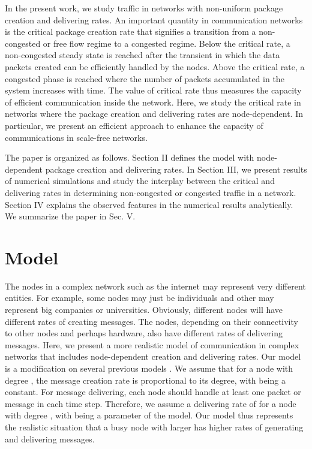 \documentclass[aps,prl,twocolumn,superscriptaddress,showpacs]{revtex4}
\begin{document}
In the present work, we study traffic in networks with non-uniform
package creation and delivering rates. An important quantity in
communication networks is the critical package creation rate that
signifies a transition from a non-congested or free flow regime to
a congested regime. Below the critical rate, a non-congested
steady state is reached after the transient in which the data
packets created can be efficiently handled by the nodes. Above the
critical rate, a congested phase is reached where the number of
packets accumulated in the system increases with time.  The value
of critical rate thus measures the capacity of efficient
communication inside the network.  Here, we study the critical
rate in networks where the package creation and delivering rates
are node-dependent.  In particular, we present an efficient
approach to enhance the capacity of communications in scale-free
networks.

The paper is organized as follows. Section II defines the model
with node-dependent package creation and delivering rates. In
Section III, we present results of numerical simulations and study
the interplay between the critical and delivering rates in
determining non-congested or congested traffic in a network.
Section IV explains the observed features in the numerical results
analytically.  We summarize the paper in Sec. V.

\section{Model}

The nodes in a complex network such as the internet may represent
very different entities.  For example, some nodes may just be
individuals and other may represent big companies or universities.
Obviously, different nodes will have different rates of creating
messages.  The nodes, depending on their connectivity to other
nodes and perhaps hardware, also have different rates of
delivering messages.  Here, we present a more realistic model of
communication in complex networks that includes node-dependent
creation and delivering rates.  Our model is a modification on
several previous models
\cite{arenas1:2002,arenas2:2004,arenas3:2003,moreno1:2003,moreno2:2004,moreno3:2004,zhao:2005}.
We assume that for a node  with degree , the message
creation rate  is proportional to its degree, with
 being a constant.  For message delivering, each node
should handle at least one packet or message in each time step.
Therefore, we assume a delivering rate of  for a node
with degree , with  being a parameter of the
model. Our model thus represents the realistic situation that a
busy node with larger  has higher rates of generating and
delivering messages.
\end{document}
